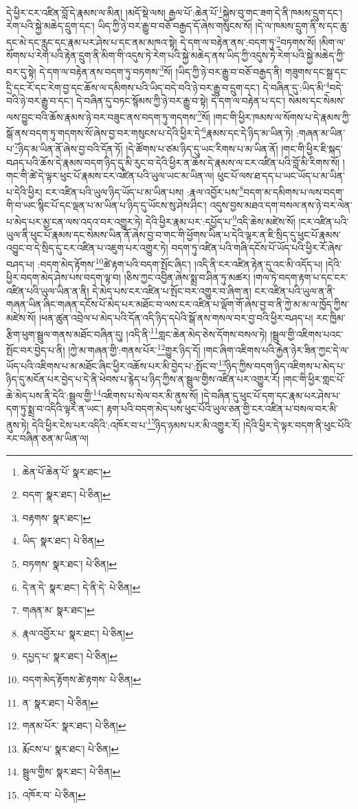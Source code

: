 དེ་ཕྱིར་ངར་འཛིན་བློ་དེ་རྣམས་ལ་མིན། །མདོ་སྡེ་ལས། རྒྱལ་པོ་:ཆེན་པོ་\footnote{ཆེན་པོ་ཆེན་པོ་  སྣར་ཐང་། }སྐྱེས་བུ་གང་ཟག་དེ་ནི་ཁམས་དྲུག་དང་། རེག་པའི་སྐྱེ་མཆེད་དྲུག་དང་། ཡིད་ཀྱི་ཉེ་བར་རྒྱུ་བ་བཅོ་བརྒྱད་དོ་ཞེས་གསུངས་སོ། །དེ་ལ་ཁམས་དྲུག་ནི་ས་དང་ཆུ་དང་མེ་དང་རླུང་དང་རྣམ་པར་ཤེས་པ་དང་ནམ་མཁའ་སྟེ། དེ་དག་ལ་བརྟེན་ནས་:བདག་ཏུ་\footnote{བདག་  སྣར་ཐང་།  པེ་ཅིན། }བཏགས་སོ། །མིག་ལ་སོགས་པ་རེག་པའི་རྟེན་དྲུག་ནི་མིག་གི་འདུས་ཏེ་རེག་པའི་སྐྱེ་མཆེད་ནས་ཡིད་ཀྱི་འདུས་ཏེ་རེག་པའི་སྐྱེ་མཆེད་ཀྱི་བར་དུ་སྟེ། དེ་དག་ལ་བརྟེན་ནས་བདག་ཏུ་བཏགས་\footnote{བརྟགས་  སྣར་ཐང་། }སོ། །ཡིད་ཀྱི་ཉེ་བར་རྒྱུ་བ་བཅོ་བརྒྱད་ནི། གཟུགས་དང་སྒྲ་དང་དྲི་དང་རོ་དང་རེག་བྱ་དང་ཆོས་ལ་དམིགས་པའི་ཡིད་བདེ་བའི་ཉེ་བར་རྒྱུ་བ་དྲུག་དང་། དེ་བཞིན་དུ་:ཡིད་མི་\footnote{ཡིད་  སྣར་ཐང་།  པེ་ཅིན། }བདེ་བའི་ཉེ་བར་རྒྱུ་བ་དང་། དེ་བཞིན་དུ་བཏང་སྙོམས་ཀྱི་ཉེ་བར་རྒྱུ་བ་སྟེ། དེ་དག་ལ་བརྟེན་པ་དང་། སེམས་དང་སེམས་ལས་བྱུང་བའི་ཆོས་རྣམས་ཉེ་བར་བཟུང་ནས་བདག་ཏུ་གདགས་\footnote{བཏགས་  སྣར་ཐང་།  པེ་ཅིན། }སོ། །གང་གི་ཕྱིར་ཁམས་ལ་སོགས་པ་དེ་རྣམས་ཀྱི་སྒོ་ནས་བདག་ཏུ་གདགས་སོ་ཞེས་བྱ་བར་གསུངས་པ་དེའི་ཕྱིར་དེ་\footnote{དེ་ན་དེ་  སྣར་ཐང་། དེ་ནི་དེ་  པེ་ཅིན། }རྣམས་དང་དེ་ཉིད་མ་ཡིན་ཏེ། :གཞན་མ་ཡིན་པ་\footnote{གཞན་མ་  སྣར་ཐང་། }ཉིད་མ་ཡིན་ནོ་ཞེས་བྱ་བའི་དོན་ཏོ། །དེ་ཚོགས་པ་ཙམ་ཉིད་དུ་ཡང་རིགས་པ་མ་ཡིན་ནོ། །གང་གི་ཕྱིར་ཇི་སྐད་བཤད་པའི་ཆོས་དེ་རྣམས་བདག་ཉིད་དུ་མི་རུང་བ་དེའི་ཕྱིར་ན་ཆོས་དེ་རྣམས་ལ་ངར་འཛིན་པའི་བློ་མི་རིགས་སོ། །གང་གི་ཚེ་དེ་ལྟར་ཕུང་པོ་རྣམས་ངར་འཛིན་པའི་ཡུལ་ཡང་མ་ཡིན་ལ། ཕུང་པོ་ལས་ཐ་དད་པ་ཡང་ཡོད་པ་མ་ཡིན་པ་དེའི་ཕྱིར། ངར་འཛིན་པའི་ཡུལ་ཉིད་ཡོད་པ་མ་ཡིན་པས། :རྣལ་འབྱོར་པས་\footnote{རྣལ་འབྱོར་པ་  སྣར་ཐང་།  པེ་ཅིན། }བདག་མ་དམིགས་པ་ལས་བདག་གི་བ་ཡང་སྙིང་པོ་དང་ལྡན་པ་མ་ཡིན་པ་ཉིད་དུ་ཡོངས་སུ་ཤེས་ཤིང་། འདུས་བྱས་མཐའ་དག་བསལ་ནས་ཉེ་བར་ལེན་པ་མེད་པར་མྱ་ངན་ལས་འདའ་བར་འགྱུར་ཏེ། དེའི་ཕྱིར་རྣམ་པར་:དཔྱོད་པ་\footnote{དཔྱད་པ་  སྣར་ཐང་།  པེ་ཅིན། }འདི་ཆེས་མཛེས་སོ། །ངར་འཛིན་པའི་ཡུལ་ནི་ཕུང་པོ་རྣམས་དང་སེམས་ཡིན་ནོ་ཞེས་བྱ་བ་གང་གི་ཕྱོགས་ཡིན་པ་དེའི་ལྟར་ན་ཇི་སྲིད་དུ་ཕུང་པོ་རྣམས་འབྱུང་བ་དེ་སྲིད་དུ་ངར་འཛིན་པ་འཇུག་པར་འགྱུར་ཏེ། བདག་ཏུ་འཛིན་པའི་གཞི་དངོས་པོ་ཡོད་པའི་ཕྱིར་རོ་ཞེས་བཤད་པ། :བདག་མེད་རྟོགས་\footnote{བདག་མེད་རྟོགས་ཚེ་རྟགས་  པེ་ཅིན། }ཚེ་རྟག་པའི་བདག་སྤོང་ཞིང་། །འདི་ནི་ངར་འཛིན་རྟེན་དུ་འང་མི་འདོད་པ། །དེའི་ཕྱིར་བདག་མེད་ཤེས་པས་བདག་ལྟ་བ། །ཅིས་ཀྱང་འབྱིན་ཞེས་སྨྲ་བ་ཤིན་ཏུ་མཚར། །གལ་ཏེ་བདག་རྟག་པ་དང་ངར་འཛིན་པའི་ཡུལ་ཡིན་ན་ནི། དེ་མེད་པས་ངར་འཛིན་པ་སྤོང་བར་འགྱུར་བ་ཞིག་ན། ངར་འཛིན་པའི་ཡུལ་ན་ནི་གཞན་ཡིན་ཞིང་གཞན་དངོས་པོ་མེད་པར་མཐོང་བ་ལས་ངར་འཛིན་པ་ལྡོག་གོ་ཞེས་བྱ་བ་ནི་ཀྱེ་མ་མ་ལ་ཁྱོད་ཀྱིས་མཛེས་སོ། །ཕན་ཚུན་འབྲེལ་པ་མེད་པའི་དོན་འདི་ཉིད་དཔེའི་སྒོ་ནས་གསལ་བར་བྱ་བའི་ཕྱིར་བཤད་པ། རང་ཁྱིམ་རྩིག་ཕུག་སྦྲུལ་གནས་མཐོང་བཞིན་དུ། །འདི་ནི་\footnote{ན་  སྣར་ཐང་།  པེ་ཅིན། }གླང་ཆེན་མེད་ཅེས་དོགས་བསལ་ཏེ། །སྦྲུལ་གྱི་འཇིགས་པའང་སྤོང་བར་བྱེད་པ་ནི། །ཀྱེ་མ་གཞན་གྱི་:གནས་པོར་\footnote{གནམ་པོར་  སྣར་ཐང་།  པེ་ཅིན། }གྱུར་ཉིད་དོ། །གང་ཞིག་འཇིགས་པའི་རྐྱེན་ཉེར་ཟིན་ཀྱང་དེ་ལ་ཡོད་པའི་འཇིགས་པ་མ་མཐོང་ཞིང་ཕྱིར་འཆོས་པར་མི་བྱེད་པ་:སྤོང་བ་\footnote{རྨོངས་པ་  སྣར་ཐང་།  པེ་ཅིན། }ཉིད་ཀྱིས་བདག་ཉིད་འཇིགས་པ་མེད་པ་ཉིད་དུ་མངོན་པར་བྱེད་པ་དེ་ནི་ཕེབས་པ་རྙེད་པ་ཉིད་ཀྱིས་ན་སྦྲུལ་གྱིས་འཛིན་པར་འགྱུར་རོ། །གང་གི་ཕྱིར་གླང་པོ་ཆེ་མེད་པས་ནི་དེའི་:སྦྲུལ་གྱི་\footnote{སྦྲུལ་གྱིས་  སྣར་ཐང་།  པེ་ཅིན། }འཇིགས་པ་སེལ་བར་མི་ནུས་སོ། །དེ་བཞིན་དུ་ཕུང་པོ་དག་དང་རྣམ་པར་ཤེས་པ་དག་ཏུ་སྨྲ་བ་འདིའི་ལྟར་ན་ཡང་། རྟག་པའི་བདག་མེད་པས་ཕུང་པོའི་ཡུལ་ཅན་གྱི་ངར་འཛིན་པ་བསལ་བར་མི་ནུས་ཏེ། དེའི་ཕྱིར་ངེས་པར་འདིའི་:འཁོར་བ་པ་\footnote{འཁོར་བ་  པེ་ཅིན། }ཉིད་ཉམས་པར་མི་འགྱུར་རོ། །དེའི་ཕྱིར་དེ་ལྟར་བདག་ནི་ཕུང་པོའི་རང་བཞིན་ཅན་མ་ཡིན་ལ། 